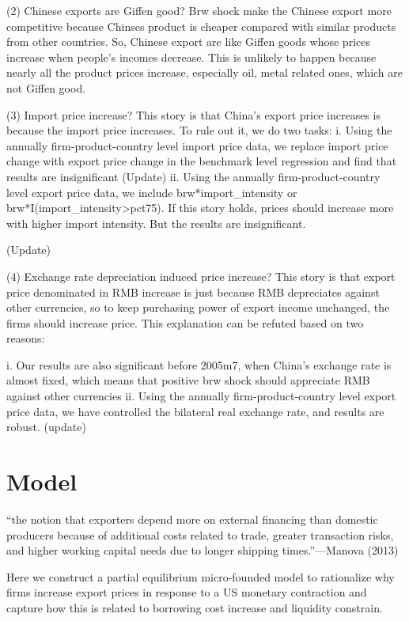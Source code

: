 \documentclass[12pt]{article}
\begin{document}
(2) Chinese exports are Giffen good?
Brw shock make the Chinese export more competitive because Chinses product is cheaper compared with similar products from other countries. So, Chinese export are like Giffen goods whose prices increase when people’s incomes decrease. This is unlikely to happen because nearly all the product prices increase, especially oil, metal related ones, which are not Giffen good.

(3) Import price increase?
This story is that China’s export price increases is because the import price increases. To rule out it, we do two tasks:
i. Using the annually firm-product-country level import price data, we replace import price change with export price change in the benchmark level regression and find that results are insignificant
(Update)
ii. Using the annually firm-product-country level export price data, we include brw*import_intensity or brw*I(import_intensity>pct75). If this story holds, prices should increase more with higher import intensity. But the results are insignificant.

 
(Update)

(4) Exchange rate depreciation induced price increase?
This story is that export price denominated in RMB increase is just because RMB depreciates against other currencies, so to keep purchasing power of export income unchanged, the firms should increase price. This explanation can be refuted based on two reasons:

i. Our results are also significant before 2005m7, when China’s exchange rate is almost fixed, which means that positive brw shock should appreciate RMB against other currencies 
ii. Using the annually firm-product-country level export price data, we have controlled the bilateral real exchange rate, and results are robust.
(update)


\section{Model}

“the notion that exporters depend more on external financing than domestic producers because of additional costs related to trade, greater transaction risks, and higher working capital needs due to longer shipping times.”—Manova (2013)

Here we construct a partial equilibrium micro-founded model to rationalize why firms increase export prices in response to a US monetary contraction and capture how this is related to borrowing cost increase and liquidity constrain.
\end{document}
